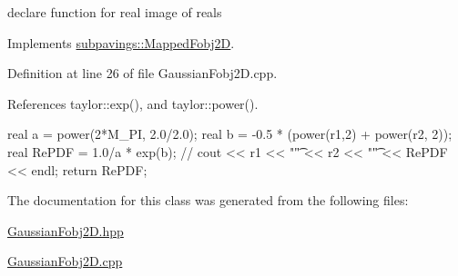 declare function for real image of reals 



\-Implements \hyperlink{classsubpavings_1_1MappedFobj2D_a0832e806f6ab166276fb238dd57ac2ad}{subpavings\-::\-Mapped\-Fobj2\-D}.



\-Definition at line 26 of file \-Gaussian\-Fobj2\-D.\-cpp.



\-References taylor\-::exp(), and taylor\-::power().


\begin{DoxyCode}
{
    real a = power(2*M_PI, 2.0/2.0);
    real b = -0.5 * (power(r1,2) + power(r2, 2));
    real RePDF = 1.0/a * exp(b);
 //   cout << r1 << "\t" << r2 << "\t" << RePDF << endl;
    return RePDF;
}
\end{DoxyCode}


\-The documentation for this class was generated from the following files\-:\begin{DoxyCompactItemize}
\item 
\hyperlink{GaussianFobj2D_8hpp}{\-Gaussian\-Fobj2\-D.\-hpp}\item 
\hyperlink{GaussianFobj2D_8cpp}{\-Gaussian\-Fobj2\-D.\-cpp}\end{DoxyCompactItemize}
